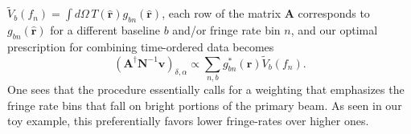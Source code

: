 \documentclass[twocolumn,apj,numberedappendix]{emulateapj}
\newcommand{\vis}{\mathbf{v}}
\newcommand{\A}{\mathbf{A}}
\newcommand{\N}{\mathbf{N}}
\newcommand{\rhat}{\hat{\mathbf{r}}}
\begin{document}
$\widetilde{V}_b (f_n)  = \int d\Omega  \,T (\hat{\mathbf{r}}) g_{bn} (\hat{\mathbf{r}})$, each row of the matrix $\mathbf{A}$ corresponds to $g_{bn} (\hat{\mathbf{r}})$ for a different baseline $b$ and/or fringe rate bin $n$, and our optimal prescription for combining time-ordered data becomes
\begin{equation}
\left( \A^\dagger \N^{-1} \vis \right)_{\delta,\alpha} \propto \sum_{n,b} g_{bn}^* (\hat{\mathbf{r}}) \widetilde{V}_b (f_n).
\end{equation}
One sees that the procedure essentially calls for a weighting that emphasizes the fringe rate bins that fall on bright portions of the primary beam. As seen in our toy example, this preferentially favors lower fringe-rates over higher ones.
%
%
%
\end{document}

